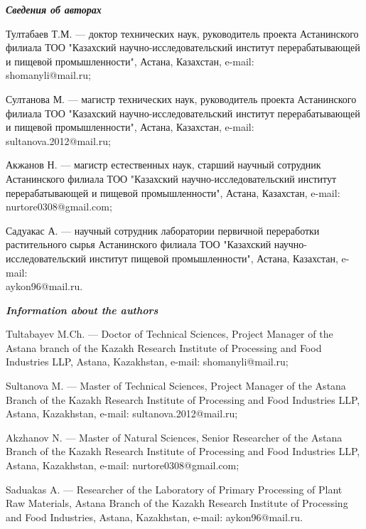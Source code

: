 \begin{authorinfo}
\emph{{\bfseries Сведения об авторах}}  

Тултабаев Т.М. — доктор технических наук, руководитель проекта
Астанинского филиала ТОО "Казахский научно-исследовательский институт
перерабатывающей и пищевой промышленности", Астана, Казахстан, e-mail:\\
shomanyli@mail.ru;

Султанова М. — магистр технических наук, руководитель проекта
Астанинского филиала ТОО "Казахский научно-исследовательский институт
перерабатывающей и пищевой промышленности", Астана, Казахстан, e-mail:\\
sultanova.2012@mail.ru;

Акжанов Н. — магистр естественных наук, старший научный сотрудник
Астанинского филиала ТОО "Казахский научно-исследовательский институт
перерабатывающей и пищевой промышленности", Астана, Казахстан, e-mail:\\
nurtore0308@gmail.com;

Садуакас А. — научный сотрудник лаборатории первичной переработки
растительного сырья Астанинского филиала ТОО "Казахский
научно-исследовательский институт пищевой промышленности", Астана,
Казахстан, e-mail: \\aykon96@mail.ru.

\emph{{\bfseries Information about the authors}}  

Tultabayev M.Ch. — Doctor of Technical Sciences, Project Manager of
the Astana branch of the Kazakh Research Institute of Processing and
Food Industries LLP, Astana, Kazakhstan, e-mail: shomanyli@mail.ru;

Sultanova M. — Master of Technical Sciences, Project Manager of the
Astana Branch of the Kazakh Research Institute of Processing and Food
Industries LLP, Astana, Kazakhstan, e-mail: sultanova.2012@mail.ru;

Akzhanov N. — Master of Natural Sciences, Senior Researcher of the
Astana Branch of the Kazakh Research Institute of Processing and Food
Industries LLP, Astana, Kazakhstan, e-mail: nurtore0308@gmail.com;

Saduakas A. — Researcher of the Laboratory of Primary Processing of
Plant Raw Materials, Astana Branch of the Kazakh Research Institute of
Processing and Food Industries, Astana, Kazakhstan, e-mail:
aykon96@mail.ru.
\end{authorinfo}
